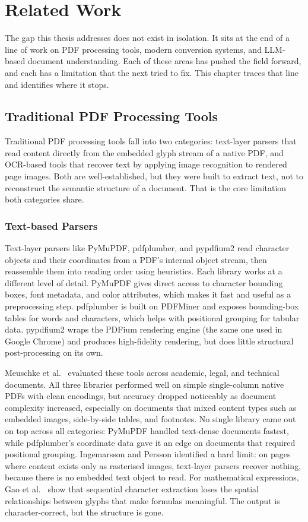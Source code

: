 \chapter{Related Work}

The gap this thesis addresses does not exist in isolation. It sits at the end
of a line of work on PDF processing tools, modern conversion systems, and
LLM-based document understanding. Each of these areas has pushed the field
forward, and each has a limitation that the next tried to fix. This chapter
traces that line and identifies where it stops.

\section{Traditional PDF Processing Tools}

Traditional PDF processing tools fall into two categories: text-layer parsers
that read content directly from the embedded glyph stream of a native PDF, and
OCR-based tools that recover text by applying image recognition to rendered
page images. Both are well-established, but they were built to extract text,
not to reconstruct the semantic structure of a document. That is the core
limitation both categories share.

\subsection{Text-based Parsers}

Text-layer parsers like PyMuPDF, pdfplumber, and pypdfium2 read character
objects and their coordinates from a PDF's internal object stream, then
reassemble them into reading order using heuristics. Each library works at a
different level of detail. PyMuPDF gives direct access to character bounding
boxes, font metadata, and color attributes, which makes it fast and useful as
a preprocessing step. pdfplumber is built on PDFMiner and exposes bounding-box
tables for words and characters, which helps with positional grouping for
tabular data. pypdfium2 wraps the PDFium rendering engine (the same one
used in Google Chrome) and produces high-fidelity rendering, but does
little structural post-processing on its own.

Meuschke et al.\ \autocite{meuschke2023} evaluated these tools across academic,
legal, and technical documents. All three libraries performed well on simple
single-column native PDFs with clean encodings, but accuracy dropped noticeably
as document complexity increased, especially on documents that mixed content
types such as embedded images, side-by-side tables, and footnotes. No single
library came out on top across all categories: PyMuPDF handled text-dense
documents fastest, while pdfplumber's coordinate data gave it an edge on
documents that required positional grouping. Ingemarsson and Persson \autocite{ingemarsson2024} identified
a hard limit: on pages where content exists only as rasterised images,
text-layer parsers recover nothing, because there is no embedded text object
to read. For mathematical expressions, Gao et al.\ \autocite{gao2011} show that
sequential character extraction loses the spatial relationships between glyphs
that make formulas meaningful. The output is character-correct, but the
structure is gone.

